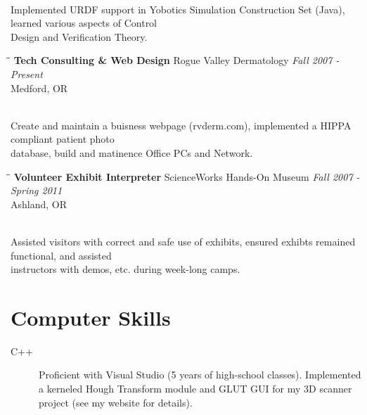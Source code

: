 \documentclass{res}
\begin{document}
\begin{resume}
\begin{tabbing}
				\\ Implemented URDF support in Yobotics Simulation Construction Set (Java), learned various aspects of Control \\Design and Verification Theory.

			\end{tabbing}\vspace{-20pt}

			\begin{tabbing}%
				\hspace{2.3in}\= \hspace{2.6in}\= \kill %
				{\bf Tech Consulting \& Web Design}	\>Rogue Valley Dermatology	\> \textit{Fall 2007 - Present}\\
													\>Medford, OR

				\\Create and maintain a buisness webpage (rvderm.com), implemented a HIPPA compliant patient photo \\database, build and matinence Office PCs and Network.

			\end{tabbing}\vspace{-20pt}

			\begin{tabbing}%
				\hspace{2.3in}\= \hspace{2.6in}\= \kill %
				{\bf Volunteer Exhibit Interpreter}	\>ScienceWorks Hands-On Museum	\> \textit{Fall 2007 - Spring 2011}\\
													\>Ashland, OR

				\\Assisted visitors with correct and safe use of exhibits, ensured exhibts remained functional, and assisted \\instructors with demos, etc. during week-long camps.

			\end{tabbing}

		\vspace{-20pt}
		\section{Computer Skills}

			\begin{description}

				\item[C++] Proficient with Visual Studio (5 years of high-school classes). Implemented a kerneled Hough Transform module  and GLUT GUI for my 3D scanner project (see my website for details).


\end{description}
\end{resume}
\end{document}
